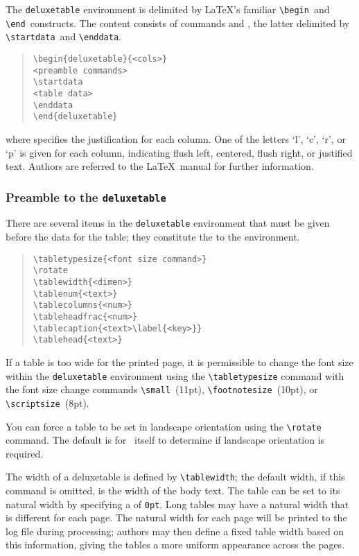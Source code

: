 \documentclass[preprint2]{aastex}
\begin{document}
The \texttt{deluxetable} environment 
is delimited by \LaTeX's familiar 
\verb"\begin"\  and \verb"\end"\  constructs. 
The content consists of  commands and , 
the latter delimited by \verb"\startdata"\ 
 and \verb"\enddata". 
\begin{quote} 
\begin{verbatim} 
\begin{deluxetable}{<cols>} 
<preamble commands> 
\startdata 
<table data> 
\enddata 
\end{deluxetable} 
\end{verbatim} 
\end{quote} 
where  specifies the justification for each col\-umn. 
One of the letters `l', `c', `r', or `p' is given for each column, 
indicating flush left, centered, flush right, or justified text. 
Authors are 
referred to the \LaTeX\ manual \citep{Lamport} for further information. 
 
\subsubsection{Preamble to the {\tt deluxetable}} 
 
There are several items in the 
\texttt{deluxetable} environment 
that 
must be given before the data for the table; 
they constitute the  to the environment. 
\begin{quote} 
\begin{verbatim} 
\tabletypesize{<font size command>}
\rotate 
\tablewidth{<dimen>} 
\tablenum{<text>} 
\tablecolumns{<num>} 
\tableheadfrac{<num>} 
\tablecaption{<text>\label{<key>}} 
\tablehead{<text>} 
\end{verbatim} 
\end{quote} 
 
If a table is too wide for the printed page, it is permissible to change 
the font size within the 
\texttt{deluxetable} environment 
using the \verb"\tabletypesize" command with the font size change commands
\verb"\small"\ 
 (11pt), \verb"\footnotesize"\ 
 (10pt), or  
\verb"\scriptsize"\ 
 (8pt). 
 
You can force a table to be set in landscape orientation 
using the \verb"\rotate"\ 
\label{cmd-rotate} command. 
The default is for \aastex\ itself to determine if landscape orientation is required. 
 
The width of a deluxetable is defined by \verb"\tablewidth"; 
the default width, if this command is omitted, is the width of the body 
text. 
The table can be set to its natural width by specifying 
a  of \verb"0pt". 
Long tables may have a natural width that is 
different for each page.  The natural width for each page will be 
printed to the log file during processing; 
authors may then define a fixed table width based 
on this information, giving the 
tables a more uniform appearance across the pages. 
 
\end{document}
